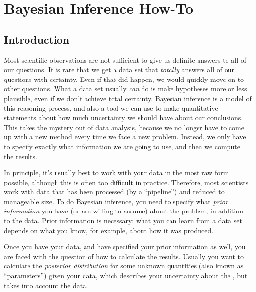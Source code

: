\newcommand{\btheta}{\boldsymbol{\theta}}
\newcommand{\data}{\boldsymbol{D}}

\author[Lecturer1]{Brendon J. Brewer\\
Department of Statistics, The University of Auckland}

\chapter{Bayesian Inference How-To}

\section{Introduction}
Most scientific observations are not sufficient to give us definite answers
to all of our questions. It is rare that we get a data set that {\it totally}
answers all of our questions with certainty. Even if that did happen, we would
quickly move on to other questions.
What a data set usually {\it can} do is make hypotheses more or less plausible,
even if we don't achieve total certainty.
Bayesian inference is a model of this
reasoning process, and also a tool we can use
to make quantitative statements about how much
uncertainty we should have about our conclusions. This takes the mystery out
of data analysis, because we no longer have to come up with a new method
every time we face a new problem. Instead, we only have to specify exactly what
information we are going to use, and then we compute the results.


In principle, it's usually best to work with your data in the most
raw form possible, although this is often too difficult in practice.
Therefore, most scientists work with data that has been processed (by a ``pipeline'') and reduced to manageable size. To do Bayesian inference, you
need to specify what {\it prior information} you have (or are willing to
assume) about the problem, in addition to the data. Prior information is
necessary: what you can learn from a data set depends on what you know, for
example, about how it was produced.

Once you have your data, and have specified your prior information as well,
you are faced with the question of how to calculate the
results. Usually you want to calculate the {\it posterior distribution} for some
unknown quantities (also known as ``parameters'') given your data, which
describes your uncertainty about the , but takes into account the data.


